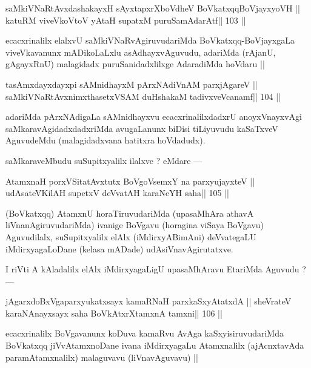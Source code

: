 \begin{shl}
saMkiVNaRtAvxdashakayxH sAyxtapxrXboVdheV BoVkatxqqBoVjayxyoVH ||
katuRM viveVkoV\s toV yAtaH supatxM puruSamAdarAtf\hfill || 103 ||
\end{shl}

\begin{artha}
ecacxrinalilx elalxvU saMkiVNaRvAgiruvudariMda BoVkatxqq-BoVjayxgaLa viveVkavanunx mADikoLaLxlu asAdhayxvAguvudu, adariMda (rAjanU, gAgayxRnU) malagidadx puruSanidadxlilxge AdaradiMda hoVdaru ||
\end{artha}

\begin{shl}
tasAmxdayxdayxpi sAMnidhayxM pArxNAdiVnAM parxjAgareV ||
saMkiVNaRtAvxnimxthasetxVSAM duHshakaM tadivxveVcanamf\hfill || 104 ||
\end{shl}

\begin{artha}
adariMda pArxNAdigaLa sAMnidhayxvu ecacxrinalilxdadxrU anoyxVnayxvAgi 
saMkaravAgidadxdadxriMda avugaLanunx biDisi tiLiyuvudu kaSaTxveV AguvudeMdu (malagidadxvana hatitxra hoVdadudx). 
\end{artha}

\begin{artha}
saMkaraveMbudu suSupitxyalilx ilalxve ? eMdare ---
\end{artha}

\begin{shl}
AtamxnaH porxVSitatAvxtutx BoVgoV\s semxY na parxyujayxteV ||
udAsateV\s KilAH supetxV deVvatAH karaNeYH saha\hfill || 105 ||
\end{shl}

\begin{artha}
(BoVkatxqq) AtamxnU horaTiruvudariMda (upasaMhAra athavA 
liVnanAgiruvudariMda) ivanige BoVgavu (horagina viSaya BoVgavu) Aguvudilalx, suSupitxyalilx elAlx (iMdirxyABimAni) deVvategaLU iMdirxyagaLoDane (kelasa mADade) udAsiVnavAgirutatxve. 
\end{artha}

\begin{artha}
I riVti A kAladalilx elAlx iMdirxyagaLigU upasaMhAravu EtariMda Aguvudu ? ---
\end{artha}

\begin{shl}
jAgarxdoBxVgaparxyukatxsayx kamaRNaH parxkaSxyAtatxdA ||
sheVrateV karaNAnayxsayx saha BoVkAtxrX\s\s tamxnA \s\s tamxni\hfill || 106 ||
\end{shl}

\begin{artha}
ecacxrinalilx BoVgavanunx koDuva kamaRvu AvAga kaSxyisiruvudariMda 
BoVkatxqq jiVvAtamxnoDane ivana iMdirxyagaLu Atamxnalilx (ajAcnxtavAda paramAtamxnalilx) malaguvavu (liVnavAguvavu) ||
\end{artha}

